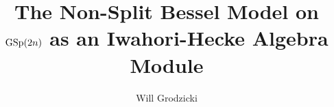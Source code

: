 \documentclass[11pt,letterpaper]{article}
\newcommand{\GSp}{\textup{GSp}}
\theoremstyle{remark}
\numberwithin{equation}{section}
\begin{document}
\title{The Non-Split Bessel Model on $\GSp(2n)$ as an Iwahori-Hecke Algebra Module}
\date{}
\author{Will Grodzicki}
\maketitle



\begin{comment}
Things I don't understand:
- integration in univ princ series context
- $c_{\alpha_1}$ identity
- Mackey theory uniqueness argument
- intertwiner domain of integration
\end{comment}

\begin{comment}
Outline:
Preliminaries (finish)
Uniqueness of Bessel functional
Calculate intertwining factor
Prove it's a Hecke algebra intertwiner (fix)
Evaluate functional at torus elements (exposition)
Formula for spherical function in the model at the torus
\end{comment}
\end{document}
